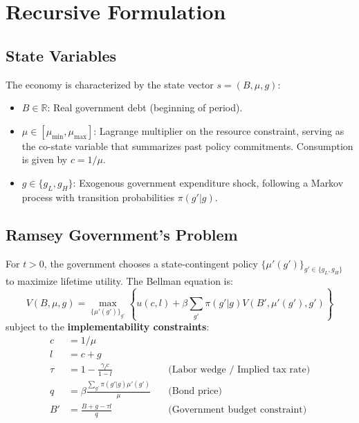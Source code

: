 \section{Recursive Formulation}

\subsection{State Variables}
The economy is characterized by the state vector $s = (B, \mu, g)$:
\begin{itemize}
    \item $B \in \mathbb{R}$: Real government debt (beginning of period).
    \item $\mu \in [\mu_{\min}, \mu_{\max}]$: Lagrange multiplier on the resource constraint, serving as the co-state variable that summarizes past policy commitments. Consumption is given by $c = 1/\mu$.
    \item $g \in \{g_L, g_H\}$: Exogenous government expenditure shock, following a Markov process with transition probabilities $\pi(g'|g)$.
\end{itemize}

\subsection{Ramsey Government's Problem}
For $t > 0$, the government chooses a state-contingent policy $\{\mu'(g')\}_{g' \in \{g_L, g_H\}}$ to maximize lifetime utility. The Bellman equation is:
\begin{equation}\label{eq:bellman}
V(B, \mu, g) = \max_{\{\mu'(g')\}_{g'}} \left\{ u(c, l) + \beta \sum_{g'} \pi(g'|g) V(B', \mu'(g'), g') \right\}
\end{equation}
subject to the \textbf{implementability constraints}:
\begin{align}
    c &= 1/\mu \label{eq:consumption}\\
    l &= c + g \label{eq:resource}\\
    \tau &= 1 - \frac{\gamma_l c}{1 - l} \quad &\text{(Labor wedge / Implied tax rate)} \label{eq:tax}\\
    q &= \beta \frac{\sum_{g'} \pi(g'|g) \mu'(g')}{\mu} \quad &\text{(Bond price)} \label{eq:bond_price}\\
    B' &= \frac{B + g - \tau l}{q} \quad &\text{(Government budget constraint)} \label{eq:budget}
\end{align}

